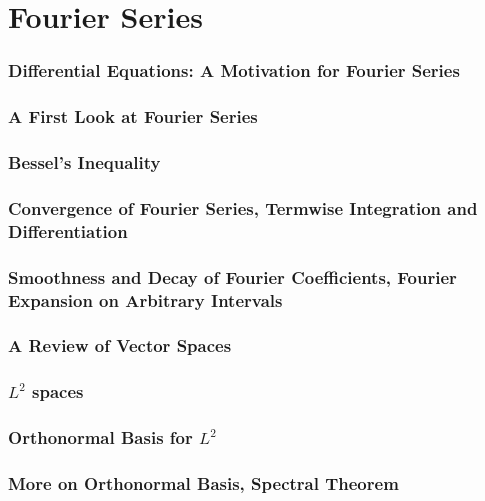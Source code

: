 \part{Fourier Series}
\section{Differential Equations: A Motivation for Fourier Series}

\section{A First Look at Fourier Series}

\section{Bessel's Inequality}

\section[Convergence, Termwise Calculus]{Convergence of Fourier Series, Termwise Integration and Differentiation}

\section[Decay of Coefficients, Arbitrary Intervals]{Smoothness and Decay of Fourier Coefficients, Fourier Expansion on Arbitrary Intervals}

\section{A Review of Vector Spaces}


\section{$L^{2}$ spaces}

\section{Orthonormal Basis for $L^2$}

\section{More on Orthonormal Basis, Spectral Theorem}

